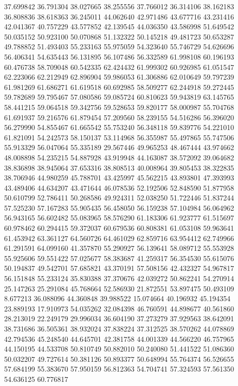 37.699842
36.791304
38.027665
38.255556
37.766012
36.314106
38.162183
36.808836
38.618363
36.245011
44.062640
42.971486
43.677716
43.231416
42.041367
40.757229
43.577852
42.139545
44.036350
43.586998
51.649542
50.035152
50.923100
50.070868
51.132322
50.145218
49.481723
50.653287
49.788852
51.493403
55.233163
55.975059
54.323640
55.746729
54.626696
56.406341
54.635443
56.131895
56.107486
56.332589
61.998108
60.196193
60.476738
58.709048
60.542335
62.424432
61.999302
60.926985
61.051547
62.223066
62.212949
62.896904
59.986053
61.306886
62.010649
59.797239
61.981269
61.686271
61.619518
60.692985
58.509277
62.244918
59.272445
59.782689
59.795467
57.080586
59.085724
60.810623
59.943819
63.145765
58.441215
59.064518
59.342756
59.528653
59.820177
58.000987
55.704768
61.691937
59.216576
61.879454
57.209560
58.239155
54.516286
56.396020
56.279990
54.855467
61.665542
55.753240
56.348118
59.839776
54.221010
61.821091
54.242573
58.150137
53.114968
56.355987
55.497865
55.747506
55.913329
56.047064
55.335189
29.567446
49.965253
48.467444
43.974662
48.008898
54.235215
54.887928
43.919948
44.163087
38.572092
39.064682
38.836898
38.945064
37.653316
38.808513
40.008964
39.805453
38.322835
38.706946
44.980259
45.788701
43.425997
45.562215
43.893801
47.393993
43.489406
44.634207
43.471644
46.078536
52.192506
52.848590
51.877958
50.610799
52.786411
50.268586
49.924311
52.038250
51.722446
51.837244
57.525230
57.167283
55.905435
56.458050
56.159238
57.104984
56.064962
56.943165
56.602482
55.083965
58.576290
61.183306
61.923777
61.515697
60.978462
60.294415
59.372037
60.679536
60.808381
61.053108
59.963641
61.453942
63.361127
64.560726
64.461029
62.859716
63.954412
62.749966
61.291591
64.099160
41.357870
55.290927
56.139641
58.089712
55.553928
55.925606
59.551422
57.025677
58.383687
41.259317
56.354530
55.615076
50.194837
49.542701
57.685821
43.370191
57.508156
42.432327
54.967817
56.151848
55.233124
35.830388
37.370676
42.039272
50.862241
54.270914
25.147263
25.291084
45.768664
52.586930
21.872551
53.897475
50.493109
8.677213
36.088096
44.360848
39.988522
15.074664
40.196932
45.194354
23.889193
17.910973
54.035262
32.084398
46.760591
44.898677
40.561860
28.213019
22.249179
29.996034
36.604190
37.273279
37.929563
38.642091
38.731686
36.505361
38.932024
37.838224
37.312525
38.570262
44.078869
42.794536
45.248540
44.645701
42.381758
44.001339
44.566220
46.757965
44.150195
44.533708
50.810749
50.882010
50.240080
51.441522
51.086360
50.032207
49.727614
50.381126
50.893377
50.648994
55.764374
56.526655
57.684199
55.383670
57.950159
56.812363
54.704741
57.324593
57.561350
54.636125
60.776817
